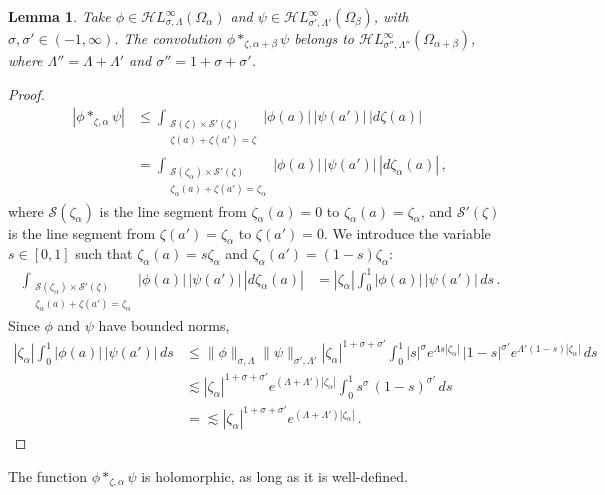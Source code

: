 \documentclass{article}
\newcommand{\singexp}[2]{\mathcal{H}L^\infty_{#1, #2}}
\theoremstyle{definition}
\theoremstyle{plain}
\newtheorem{lemma}[definition]{Lemma}
\newenvironment{old}{\color{RoyalBlue}}{\color{black}}
\newenvironment{revised}{\color{DarkBlue}}{\color{black}}
\newenvironment{revised}{}{}
\begin{document}
\begin{revised}
\begin{lemma}
Take $\phi\in\singexp{\sigma}{\Lambda}(\Omega_\alpha)$ and $\psi\in\singexp{\sigma'}{\Lambda'}(\Omega_\beta)$, with $\sigma,\sigma'\in (-1,\infty)$. The convolution $\phi\ast_{\zeta,\alpha+\beta}\psi$ belongs to $\singexp{\sigma''}{\Lambda''}(\Omega_{\alpha+\beta})$, where $\Lambda'' = \Lambda + \Lambda'$ and $\sigma'' = 1 + \sigma + \sigma'$.  \end{lemma}    
\begin{proof}
\begin{align*}
\left|\phi\ast_{\zeta,\alpha}\psi\right|&\le\int_{\substack{\mathcal{S}(\zeta)\times\mathcal{S}'(\zeta)\\ \zeta(a)+\zeta(a')=\zeta}} |\phi(a)|\,|\psi(a')|\,|d\zeta(a)| \\
& = \int_{\substack{\mathcal{S}(\zeta_\alpha)\times\mathcal{S}'(\zeta)\\ \zeta_\alpha(a)+\zeta(a')=\zeta_\alpha}} |\phi(a)|\,|\psi(a')|\,|d\zeta_\alpha(a)|\,,
\end{align*}
where $\mathcal{S}(\zeta_\alpha)$ is the line segment from $\zeta_\alpha(a)=0$ to $\zeta_\alpha(a)=\zeta_\alpha$, and $\mathcal{S}'(\zeta)$ is the line segment from $\zeta(a')=\zeta_\alpha$ to $\zeta(a')=0$. We introduce the variable $s\in[0,1]$ such that $\zeta_\alpha(a)=s\zeta_\alpha$ and $\zeta_\alpha(a')=(1-s)\zeta_\alpha$:
\begin{align*}
  \int_{\substack{\mathcal{S}(\zeta_\alpha)\times\mathcal{S}'(\zeta)\\ \zeta_\alpha(a)+\zeta(a')=\zeta_\alpha}} |\phi(a)|\,|\psi(a')|\,|d\zeta_\alpha(a)|&= |\zeta_\alpha|\int_0^1 |\phi(a)|\,|\psi(a')|\, ds\,.
\end{align*}
Since $\phi$ and $\psi$ have bounded norms,
\begin{align*}
|\zeta_\alpha|\int_0^1 |\phi(a)|\,|\psi(a')|\, ds&\le \|\phi\|_{\sigma,\Lambda} \|\psi\|_{\sigma',\Lambda'} |\zeta_\alpha|^{1+\sigma+\sigma'}\int_0^1  |s|^{\sigma}e^{\Lambda s |\zeta_\alpha|}\,|1-s|^{\sigma'}e^{\Lambda' (1-s)|\zeta_\alpha|}\,ds\\
&\lesssim |\zeta_\alpha| ^{1+\sigma+\sigma'} e^{(\Lambda+\Lambda')|\zeta_\alpha|}\int_0^1  s^{\sigma}\,(1-s)^{\sigma'}\,ds\\
&=\lesssim |\zeta_\alpha| ^{1+\sigma+\sigma'} e^{(\Lambda+\Lambda')|\zeta_\alpha|}\,.
\end{align*}
\end{proof}
\end{revised}
\begin{old}
The function $\phi \ast_{\zeta, \alpha} \psi$ is holomorphic, as long as it is well-defined.\end{old} 
\end{document}

